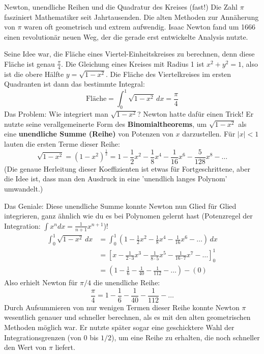 \begin{funfactbox}{Newton, unendliche Reihen und die Quadratur des Kreises (fast!)}
Die Zahl $\pi$ fasziniert Mathematiker seit Jahrtausenden. Die alten Methoden zur Annäherung von $\pi$ waren oft geometrisch und extrem aufwendig. Isaac Newton fand um 1666 einen revolutionär neuen Weg, der die gerade erst entwickelte Analysis nutzte.

Seine Idee war, die Fläche eines Viertel-Einheitskreises zu berechnen, denn diese Fläche ist genau $\frac{\pi}{4}$. Die Gleichung eines Kreises mit Radius 1 ist $x^2+y^2=1$, also ist die obere Hälfte $y = \sqrt{1-x^2}$. Die Fläche des Viertelkreises im ersten Quadranten ist dann das bestimmte Integral:
\[ \text{Fläche} = \int_0^1 \sqrt{1-x^2} \,dx = \frac{\pi}{4} \]
Das Problem: Wie integriert man $\sqrt{1-x^2}$? Newton hatte dafür einen Trick! Er nutzte seine verallgemeinerte Form des \textbf{Binomialtheorems}, um $\sqrt{1-x^2}$ als eine \textbf{unendliche Summe (Reihe)} von Potenzen von $x$ darzustellen. Für $|x|<1$ lauten die ersten Terme dieser Reihe:
\[ \sqrt{1-x^2} = (1-x^2)^{\frac{1}{2}} = 1 - \frac{1}{2}x^2 - \frac{1}{8}x^4 - \frac{1}{16}x^6 - \frac{5}{128}x^8 - \dots \]
(Die genaue Herleitung dieser Koeffizienten ist etwas für Fortgeschrittene, aber die Idee ist, dass man den Ausdruck in eine 'unendlich langes Polynom' umwandelt.)

Das Geniale: Diese unendliche Summe konnte Newton nun Glied für Glied integrieren, ganz ähnlich wie du es bei Polynomen gelernt hast (Potenzregel der Integration: $\int x^n dx = \frac{1}{n+1}x^{n+1}$)!
\begin{align*} \int_0^1 \sqrt{1-x^2} \,dx &= \int_0^1 \left(1 - \frac{1}{2}x^2 - \frac{1}{8}x^4 - \frac{1}{16}x^6 - \dots \right) \,dx \\ &= \left[ x - \frac{1}{2 \cdot 3}x^3 - \frac{1}{8 \cdot 5}x^5 - \frac{1}{16 \cdot 7}x^7 - \dots \right]_0^1 \\ &= \left(1 - \frac{1}{6} - \frac{1}{40} - \frac{1}{112} - \dots \right) - (0) \end{align*}
Also erhielt Newton für $\pi/4$ die unendliche Reihe:
\[ \frac{\pi}{4} = 1 - \frac{1}{6} - \frac{1}{40} - \frac{1}{112} - \dots \]
Durch Aufsummieren von nur wenigen Termen dieser Reihe konnte Newton $\pi$ wesentlich genauer und schneller berechnen, als es mit den alten geometrischen Methoden möglich war. Er nutzte später sogar eine geschicktere Wahl der Integrationsgrenzen (von $0$ bis $1/2$), um eine Reihe zu erhalten, die noch schneller den Wert von $\pi$ liefert.


\end{funfactbox}
